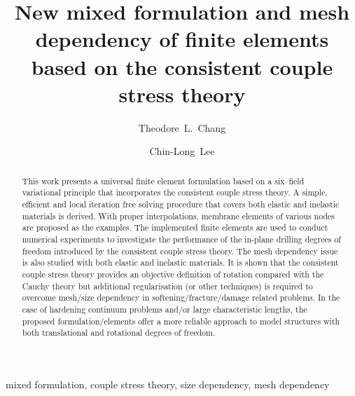 \documentclass[3p,sort&compress,11pt,fleqn,review]{elsarticle}
\begin{document}
\begin{abstract}
This work presents a universal finite element formulation based on a six--field variational principle that incorporates the consistent couple stress theory. A simple, efficient and local iteration free solving procedure that covers both elastic and inelastic materials is derived. With proper interpolations, membrane elements of various nodes are proposed as the examples. The implemented finite elements are used to conduct numerical experiments to investigate the performance of the in-plane drilling degrees of freedom introduced by the consistent couple stress theory. The mesh dependency issue is also studied with both elastic and inelastic materials. It is shown that the consistent couple stress theory provides an objective definition of rotation compared with the Cauchy theory but additional regularisation (or other techniques) is required to overcome mesh/size dependency in softening/fracture/damage related problems. \alert{In the case of hardening continuum problems and/or large characteristic lengths, the proposed formulation/elements offer a more reliable approach to model structures with both translational and rotational degrees of freedom.}
\end{abstract}
\begin{keyword}
mixed formulation\sep
couple stress theory\sep
size dependency\sep
mesh dependency
\end{keyword}
\begin{frontmatter}
\title{New mixed formulation and mesh dependency of finite elements based on the consistent couple stress theory}
\author[]{Theodore~L.~Chang}
\author[]{Chin-Long~Lee}
\address{Department of Civil and Natural Resources Engineering, University of Canterbury, Christchurch, New Zealand, 8041.}
\end{frontmatter}
\end{document}
